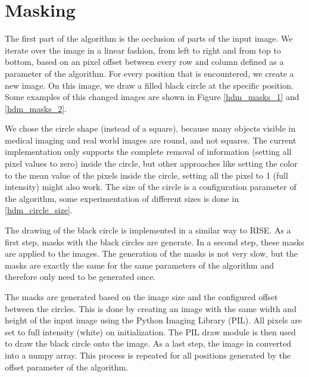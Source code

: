 \section{Masking}

The first part of the algorithm is the occlusion of parts of the input image.
We iterate over the image in a linear fashion, from left to right and from top to bottom, based on an pixel offset between every row and column defined as a parameter of the algorithm.
For every position that is encountered, we create a new image. On this image, we draw a filled black circle at the specific position.
Some examples of this changed images are shown in Figure \ref{hdm_masks_1} and \ref{hdm_masks_2}.

We chose the circle shape (instead of a square), because many objects visible in medical imaging and real world images are round, and not squares.
The current implementation only supports the complete removal of information (setting all pixel values to zero) inside the circle, but other approaches like
setting the color to the mean value of the pixels inside the circle, setting all the pixel to 1 (full intensity) might also work.
The size of the circle is a configuration parameter of the algorithm, some experimentation of different sizes is done in \autoref{hdm_circle_size}.

The drawing of the black circle is implemented in a similar way to RISE. As a first step, masks with the black circles are generate. In a second step,
these masks are applied to the images. The generation of the masks is not very slow, but the masks are exactly the same for the same parameters of the algorithm and therefore
only need to be generated once.

The masks are generated based on the image size and the configured offset between the circles.
This is done by creating an image with the same width and height of the input image using the Python Imaging Library (PIL). All pixels are set to full intensity (white) on initialization.
The PIL draw module is then used to draw the black circle onto the image. As a last step, the image in converted into a numpy array. This process is repeated for all positions generated
by the offset parameter of the algorithm.

